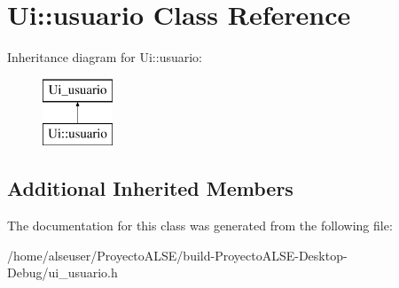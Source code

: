 \hypertarget{class_ui_1_1usuario}{}\section{Ui\+:\+:usuario Class Reference}
\label{class_ui_1_1usuario}
Inheritance diagram for Ui\+:\+:usuario\+:\begin{figure}[H]
\begin{center}
\leavevmode
\includegraphics[height=2.000000cm]{class_ui_1_1usuario}
\end{center}
\end{figure}
\subsection*{Additional Inherited Members}


The documentation for this class was generated from the following file\+:\begin{DoxyCompactItemize}
\item 
/home/alseuser/\+Proyecto\+A\+L\+S\+E/build-\/\+Proyecto\+A\+L\+S\+E-\/\+Desktop-\/\+Debug/ui\+\_\+usuario.\+h\end{DoxyCompactItemize}
